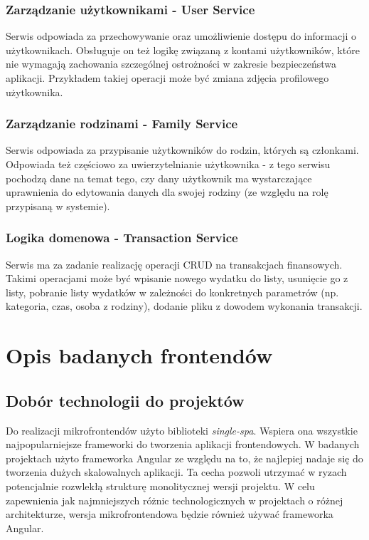 \documentclass{SGGW-thesis}
\begin{document}
    \subsection{Zarządzanie użytkownikami - User Service}
    Serwis odpowiada za przechowywanie oraz umożliwienie dostępu do informacji o użytkownikach. Obsługuje on też logikę związaną z kontami użytkowników, które nie wymagają zachowania szczególnej ostrożności w zakresie bezpieczeństwa aplikacji. Przykładem takiej operacji może być zmiana zdjęcia profilowego użytkownika.

    \subsection{Zarządzanie rodzinami - Family Service}
    Serwis odpowiada za przypisanie użytkowników do rodzin, których są członkami. Odpowiada też częściowo za uwierzytelnianie użytkownika - z tego serwisu pochodzą dane na temat tego, czy dany użytkownik ma wystarczające uprawnienia do edytowania danych dla swojej rodziny (ze względu na rolę przypisaną w systemie).

    \subsection{Logika domenowa - Transaction Service}
    Serwis ma za zadanie realizację operacji CRUD na transakcjach finansowych. Takimi operacjami może być wpisanie nowego wydatku do listy, usunięcie go z listy, pobranie listy wydatków w zależności do konkretnych parametrów (np. kategoria, czas, osoba z rodziny), dodanie pliku z dowodem wykonania transakcji.

\chapter{Opis badanych frontendów}
  \section{Dobór technologii do projektów}
  Do realizacji mikrofrontendów użyto biblioteki \textit{single-spa}. Wspiera ona wszystkie najpopularniejsze frameworki do tworzenia aplikacji frontendowych. W badanych projektach użyto frameworka Angular ze względu na to, że najlepiej nadaje się do tworzenia dużych skalowalnych aplikacji. Ta cecha pozwoli utrzymać w ryzach potencjalnie rozwlekłą strukturę monolitycznej wersji projektu. W celu zapewnienia jak najmniejszych różnic technologicznych w projektach o różnej architekturze, wersja mikrofrontendowa będzie również używać frameworka Angular.
\end{document}
